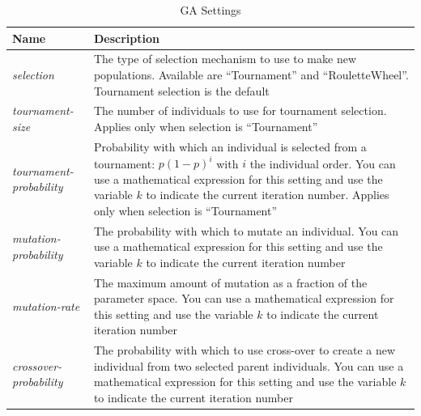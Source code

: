 \documentclass{article}
\begin{document}
\begin{table}[h!tb]\caption{GA Settings}\label{tab:ga_settings}\vspace{0.1in}
	\centering

	\begin{tabular}{p{4cm} p{10cm}}
		\toprule
		\textbf{Name} & \textbf{Description} \\
		\midrule
		\textit{selection} & The type of selection mechanism to use to make
		                     new populations. Available are ``Tournament'' and
		                     ``RouletteWheel''. Tournament selection is the
		                     default \\
		\textit{tournament-size} & The number of individuals to use for
		                           tournament selection. Applies only when
		                           selection is ``Tournament'' \\
		\textit{tournament-probability} & Probability with which an individual
		                                  is selected from a tournament:
		                                  $p (1 - p)^i$ with $i$ the individual
		                                  order. You can use a mathematical
		                                  expression for this setting and use
		                                  the variable $k$ to indicate the
		                                  current iteration number. Applies only
		                                  when selection is ``Tournament'' \\
		\textit{mutation-probability} & The probability with which to mutate an
		                                individual. You can use a mathematical
		                                expression for this setting and use
		                                the variable $k$ to indicate the
		                                current iteration number \\
		\textit{mutation-rate} & The maximum amount of mutation as a fraction
		                         of the parameter space. You can use a mathematical
		                         expression for this setting and use
		                         the variable $k$ to indicate the
		                         current iteration number \\
		\textit{crossover-probability} & The probability with which to use
		                                 cross-over to create a new individual
		                                 from two selected parent individuals.
		                                 You can use a mathematical
		                                 expression for this setting and use
		                                 the variable $k$ to indicate the
		                                 current iteration number \\
		\bottomrule
	\end{tabular}
\end{table}
\end{document}
